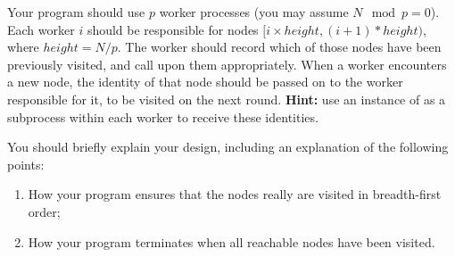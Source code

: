 \begin{question}
\begin{enumerate}
Your program should use $p$ worker processes (you may assume $N \mod p = 0$).
Each worker $i$ should be responsible for nodes $[i \times height,
  (i+1)*height)$, where $height = N/p$.  The worker should record which of
those nodes have been previously visited, and call  upon them
  appropriately.  When a worker encounters a new node, the identity of that
  node should be passed on to the worker responsible for it, to be visited
  on the next round.  {\bf Hint:} use an instance of  as a
  subprocess within each worker to receive these identities.

You should briefly explain your design, including an explanation of the
following points:
%
\begin{enumerate}
\item
How your program ensures that the nodes really are visited in breadth-first
order; 

\item
How your program terminates when all reachable nodes have been visited.
\end{enumerate}


\end{enumerate}


\end{question}


